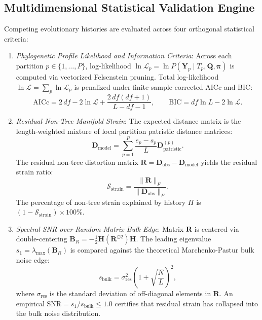 \subsection{Multidimensional Statistical Validation Engine}
Competing evolutionary histories are evaluated across four orthogonal statistical criteria:
\begin{enumerate}
    \item \emph{Phylogenetic Profile Likelihood and Information Criteria}: Across each partition $p \in \{1, \dots, P\}$, log-likelihood $\ln \mathcal{L}_p = \ln P(\mathbf{Y}_p \mid T_p, \mathbf{Q}, \bm{\pi})$ is computed via vectorized Felsenstein pruning. Total log-likelihood $\ln \mathcal{L} = \sum_p \ln \mathcal{L}_p$ is penalized under finite-sample corrected AICc and BIC:
    \begin{equation}
    \mathrm{AICc} = 2\,df - 2\ln \mathcal{L} + \frac{2\,df(df + 1)}{L - df - 1}, \qquad \mathrm{BIC} = df \ln L - 2\ln \mathcal{L}.
    \end{equation}
    \item \emph{Residual Non-Tree Manifold Strain}: The expected distance matrix is the length-weighted mixture of local partition patristic distance matrices:
    \begin{equation}
    \mathbf{D}_{\mathrm{model}} = \sum_{p=1}^P \frac{e_p - s_p}{L} \mathbf{D}_{\mathrm{patristic}}^{(p)}.
    \end{equation}
    The residual non-tree distortion matrix $\mathbf{R} = \mathbf{D}_{\mathrm{obs}} - \mathbf{D}_{\mathrm{model}}$ yields the residual strain ratio:
    \begin{equation}
    \mathcal{S}_{\mathrm{strain}} = \frac{\|\mathbf{R}\|_F}{\|\mathbf{D}_{\mathrm{obs}}\|_F}.
    \end{equation}
    The percentage of non-tree strain explained by history $H$ is $(1 - \mathcal{S}_{\mathrm{strain}}) \times 100\%$.
    \item \emph{Spectral SNR over Random Matrix Bulk Edge}: Matrix $\mathbf{R}$ is centered via double-centering $\mathbf{B}_R = -\frac{1}{2}\mathbf{H}(\mathbf{R}^{\odot 2})\mathbf{H}$. The leading eigenvalue $s_1 = \lambda_{\max}(\mathbf{B}_R)$ is compared against the theoretical Marchenko-Pastur bulk noise edge:
    \begin{equation}
    s_{\mathrm{bulk}} = \sigma_{\mathrm{res}}^2 \left(1 + \sqrt{\frac{N}{L}}\right)^2,
    \end{equation}
    where $\sigma_{\mathrm{res}}$ is the standard deviation of off-diagonal elements in $\mathbf{R}$. An empirical $\mathrm{SNR} = s_1 / s_{\mathrm{bulk}} \le 1.0$ certifies that residual strain has collapsed into the bulk noise distribution.

\end{enumerate}
